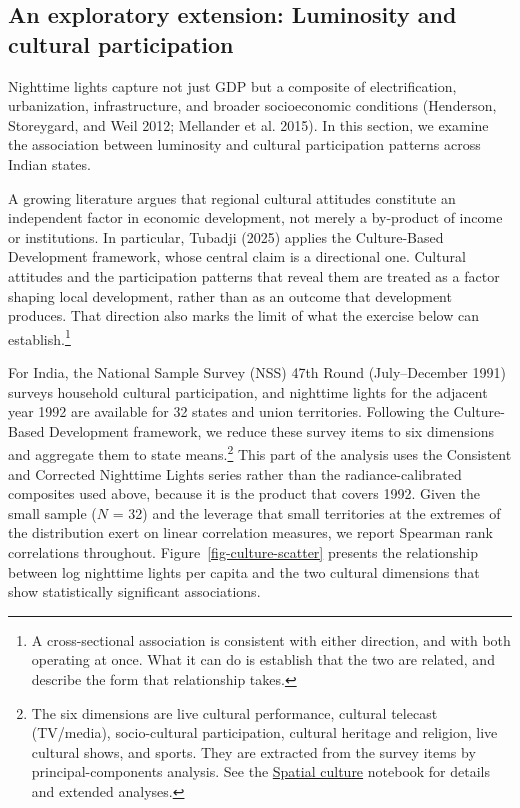 \documentclass[
  letterpaper,
  DIV=11,
  numbers=noendperiod]{scrartcl}
\begin{document}
\subsection{An exploratory extension: Luminosity and cultural
participation}\label{an-exploratory-extension-luminosity-and-cultural-participation}

Nighttime lights capture not just GDP but a composite of
electrification, urbanization, infrastructure, and broader socioeconomic
conditions (Henderson, Storeygard, and Weil 2012; Mellander et al.
2015). In this section, we examine the association between luminosity
and cultural participation patterns across Indian states.

A growing literature argues that regional cultural attitudes constitute
an independent factor in economic development, not merely a by-product
of income or institutions. In particular, Tubadji (2025) applies the
Culture-Based Development framework, whose central claim is a
directional one. Cultural attitudes and the participation patterns that
reveal them are treated as a factor shaping local development, rather
than as an outcome that development produces. That direction also marks
the limit of what the exercise below can establish.\footnote{A
  cross-sectional association is consistent with either direction, and
  with both operating at once. What it can do is establish that the two
  are related, and describe the form that relationship takes.}

For India, the National Sample Survey (NSS) 47th Round (July--December
1991) surveys household cultural participation, and nighttime lights for
the adjacent year 1992 are available for 32 states and union
territories. Following the Culture-Based Development framework, we
reduce these survey items to six dimensions and aggregate them to state
means.\footnote{The six dimensions are live cultural performance,
  cultural telecast (TV/media), socio-cultural participation, cultural
  heritage and religion, live cultural shows, and sports. They are
  extracted from the survey items by principal-components analysis. See
  the
  \href{https://quarcs-lab.github.io/project2025s-py/notebooks/c06_spatial_culture.html}{Spatial
  culture} notebook for details and extended analyses.} This part of the
analysis uses the Consistent and Corrected Nighttime Lights series
rather than the radiance-calibrated composites used above, because it is
the product that covers 1992. Given the small sample (\(N\) = 32) and
the leverage that small territories at the extremes of the distribution
exert on linear correlation measures, we report Spearman rank
correlations throughout. Figure~\ref{fig-culture-scatter} presents the
relationship between log nighttime lights per capita and the two
cultural dimensions that show statistically significant associations.
\end{document}
